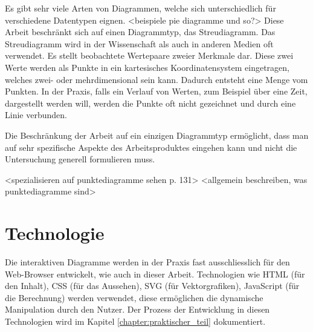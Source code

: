 Es gibt sehr viele Arten von Diagrammen, welche sich unterschiedlich für verschiedene Datentypen eignen. <beispiele pie diagramme und so?> Diese Arbeit beschränkt sich auf einen Diagrammtyp, das Streudiagramm. Das Streudiagramm wird in der Wissenschaft als auch in anderen Medien oft verwendet. Es stellt beobachtete Wertepaare zweier Merkmale dar. Diese zwei Werte werden als Punkte in ein kartesisches Koordinatensystem eingetragen, welches zwei- oder mehrdimensional sein kann. Dadurch entsteht eine Menge vom Punkten. In der Praxis, falls ein Verlauf von Werten, zum Beispiel über eine Zeit, dargestellt werden will, werden die Punkte oft nicht gezeichnet und durch eine Linie verbunden.

Die Beschränkung der Arbeit auf ein einzigen Diagrammtyp ermöglicht, dass man auf sehr spezifische Aspekte des Arbeitsproduktes eingehen kann und nicht die Untersuchung generell formulieren muss.

<spezialisieren auf punktediagramme sehen p. 131>
<allgemein beschreiben, was punktediagramme sind>

\section{Technologie}

Die interaktiven Diagramme werden in der Praxis fast ausschliesslich für den Web-Browser entwickelt, wie auch in dieser Arbeit. Technologien wie HTML (für den Inhalt), CSS (für das Aussehen), SVG (für Vektorgrafiken), JavaScript (für die Berechnung) werden verwendet, diese ermöglichen die dynamische Manipulation durch den Nutzer. Der Prozess der Entwicklung in diesen Technologien wird im Kapitel \ref{chapter:praktischer_teil} dokumentiert.
